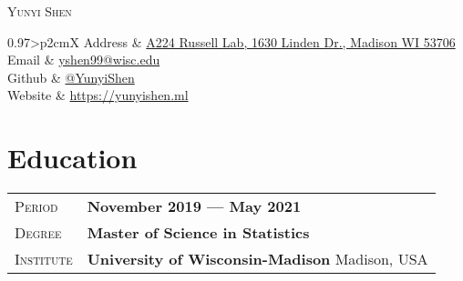 \documentclass[letterpaper, oneside, final]{scrartcl} %
\begin{document}
	
\begin{center} %


{\fontsize{36}{36}\selectfont\scshape Yunyi Shen} %

\vspace{1.5cm} %
\hspace{-2cm}


\begin{tabularx}{0.97\linewidth}{>{\raggedleft\scshape}p{2cm}X}
	Address & \href{https://www.google.com/maps/place/Russell+Laboratories,+1630+Linden+Dr,+Madison,+WI+53706/@43.0755343,-89.4157108,17z/data=!3m1!4b1!4m5!3m4!1s0x8807acc0bc8b45b9:0x855709798126d445!8m2!3d43.0755304!4d-89.4135221}{A224 Russell Lab, 1630 Linden Dr., Madison WI 53706} \\
	Email & \href{mailto://yshen99@wisc.edu}{yshen99@wisc.edu}\\
	Github & \href{https://github.com/YunyiShen}{@YunyiShen}\\
	Website & \href{https://yunyishen.ml}{https://yunyishen.ml}
\end{tabularx}



\section{Education}
\begin{tabularx}{0.97\linewidth}{>{\raggedleft\scshape}p{2cm}X}
	Period & \textbf{November 2019 --- May 2021}\\
	Degree & \textbf{Master of Science in Statistics}\\
	Institute & \textbf{University of Wisconsin-Madison} \hfill Madison, USA\\
\end{tabularx}


\end{center}
\end{document}
